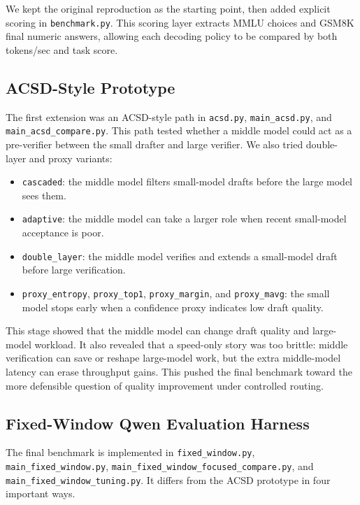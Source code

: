 \documentclass[11pt]{article}
\begin{document}
We kept the original reproduction as the starting point, then added explicit scoring in \texttt{benchmark.py}. This scoring layer extracts MMLU choices and GSM8K final numeric answers, allowing each decoding policy to be compared by both tokens/sec and task score.

\subsection{ACSD-Style Prototype}

The first extension was an ACSD-style path in \texttt{acsd.py}, \texttt{main\_acsd.py}, and \texttt{main\_acsd\_compare.py}. This path tested whether a middle model could act as a pre-verifier between the small drafter and large verifier. We also tried double-layer and proxy variants:

\begin{itemize}
  \item \texttt{cascaded}: the middle model filters small-model drafts before the large model sees them.
  \item \texttt{adaptive}: the middle model can take a larger role when recent small-model acceptance is poor.
  \item \texttt{double\_layer}: the middle model verifies and extends a small-model draft before large verification.
  \item \texttt{proxy\_entropy}, \texttt{proxy\_top1}, \texttt{proxy\_margin}, and \texttt{proxy\_mavg}: the small model stops early when a confidence proxy indicates low draft quality.
\end{itemize}

This stage showed that the middle model can change draft quality and large-model workload. It also revealed that a speed-only story was too brittle: middle verification can save or reshape large-model work, but the extra middle-model latency can erase throughput gains. This pushed the final benchmark toward the more defensible question of quality improvement under controlled routing.

\subsection{Fixed-Window Qwen Evaluation Harness}

The final benchmark is implemented in \texttt{fixed\_window.py}, \texttt{main\_fixed\_window.py}, \texttt{main\_fixed\_window\_focused\_compare.py}, and \texttt{main\_fixed\_window\_tuning.py}. It differs from the ACSD prototype in four important ways.
\end{document}
